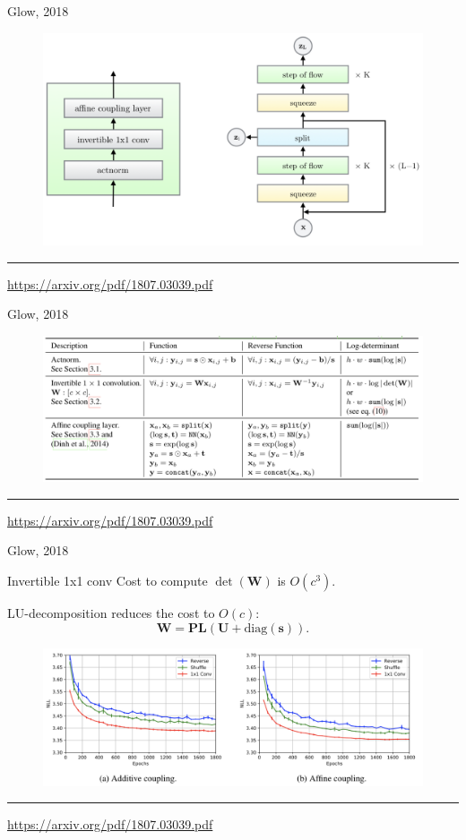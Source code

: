 \documentclass{beamer}
\begin{document}
\begin{frame}{Glow, 2018}
	\begin{figure}
		\centering
		\includegraphics[width=\linewidth]{figs/glow_block.png}
	\end{figure}
	\vfill
	\hrule\medskip
	{\scriptsize \href{https://arxiv.org/pdf/1807.03039.pdf}{https://arxiv.org/pdf/1807.03039.pdf}}   
\end{frame}
\begin{frame}{Glow, 2018}
	\begin{figure}
		\centering
		\includegraphics[width=\linewidth]{figs/glow_ops.png}
	\end{figure}
	\vfill
	\hrule\medskip
	{\scriptsize \href{https://arxiv.org/pdf/1807.03039.pdf}{https://arxiv.org/pdf/1807.03039.pdf}}    
\end{frame}
\begin{frame}{Glow, 2018}
	\begin{block}{Invertible 1x1 conv}
		Cost to compute $\det (\mathbf{W})$ is $O(c^3)$. 
		
		LU-decomposition reduces the cost to $O(c)$:
		\[
		\mathbf{W} = \mathbf{P}\mathbf{L}(\mathbf{U} + \text{diag}(\mathbf{s})).
		\]
	\end{block}
	\begin{figure}
		\centering
		\includegraphics[width=\linewidth]{figs/glow_1x1_conv.png}
	\end{figure}
	\vfill
	\hrule\medskip
	{\scriptsize \href{https://arxiv.org/pdf/1807.03039.pdf}{https://arxiv.org/pdf/1807.03039.pdf}}    
\end{frame}
\end{document}
